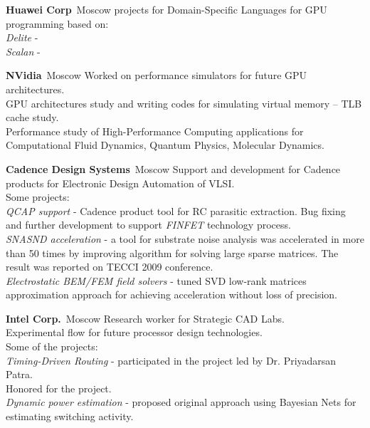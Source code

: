 \documentclass[11pt,a4paper,roman]{moderncv}
\begin{document}
    {{\bfseries{Huawei Corp}}\ }{Moscow}{}{
  projects for Domain-Specific Languages for GPU programming based on: \\
  \emph{Delite} -  \\
  \emph{Scalan} -  \\
}

    {{\bfseries{NVidia}}\ }{Moscow}{}{
  Worked on performance simulators for future GPU architectures. \\
  GPU architectures study and writing codes for simulating virtual memory -- TLB cache study. \\
  Performance study of High-Performance Computing applications for Computational Fluid Dynamics, Quantum Physics, Molecular Dynamics. \\
}

    {{\bfseries{Cadence Design Systems}}\ }{Moscow}{}{
  Support and development for Cadence products for Electronic Design Automation of VLSI. \\
  Some projects: \\
  \emph{QCAP support} - Cadence product tool for RC parasitic extraction. Bug fixing and further development to support {\em{FINFET}} technology process. \\
  \emph{SNASND acceleration} - a tool for substrate noise analysis was accelerated in more than 50 times by improving algorithm for solving large sparse matrices. The result was reported on TECCI 2009 conference. \\
  \emph{Electrostatic BEM/FEM field solvers} - tuned SVD low-rank matrices approximation approach for achieving acceleration without loss of precision. \\
}

    {{\bfseries{Intel Corp.}}\ }{Moscow}{}{
    Research worker for Strategic CAD Labs. \\
    Experimental flow for future processor design technologies. \\
    Some of the projects: \\
    \emph{Timing-Driven Routing} - participated in the project led by Dr. Priyadarsan Patra. \\
    Honored for the project. \\
    \emph{Dynamic power estimation} - proposed original approach using Bayesian Nets for estimating switching activity. \\
}
\end{document}
